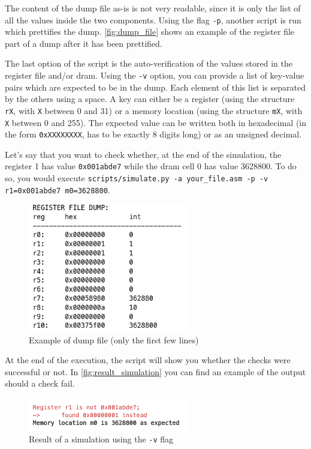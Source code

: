 The content of the dump file as-is is not very readable, since it is only the list of all the values inside the two components.
Using the flag \texttt{-p}, another script is run which prettifies the dump.
\autoref{fig:dump_file} shows an example of the register file part of a dump after it has been prettified.

The last option of the script is the auto-verification of the values stored in the register file and/or dram. 
Using the \texttt{-v} option, you can provide a list of key-value pairs which are expected to be in the dump. 
Each element of this list is separated by the others using a space.
A key can either be a register (using the structure \texttt{rX}, with \texttt{X} between 0 and 31) or a memory location (using the structure \texttt{mX}, with \texttt{X} between 0 and 255).
The expected value can be written both in hexadecimal (in the form \texttt{0xXXXXXXXX}, has to be exactly 8 digits long) or as an unsigned decimal.

Let's say that you want to check whether, at the end of the simulation, the register 1 has value \texttt{0x001abde7} while the dram cell 0 has value 3628800. 
To do so, you would execute \texttt{scripts/simulate.py -a your\_file.asm -p -v r1=0x001abde7 m0=3628800}.

\begin{figure}
    \centering
    \includegraphics[width=70mm]{images/dump_ex.png}
    \caption{Example of dump file (only the first few lines)}
    \label{fig:dump_file}
\end{figure}

At the end of the execution, the script will show you whether the checks were successful or not. 
In \autoref{fig:result_simulation} you can find an example of the output should a check fail.

\begin{figure}
    \centering
    \includegraphics[width=70mm]{images/result_simulation.png}
    \caption{Result of a simulation using the \texttt{-v} flag}
    \label{fig:result_simulation}
\end{figure}

